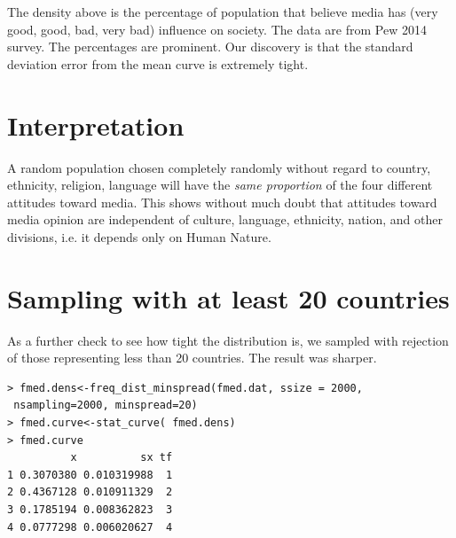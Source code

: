 \documentclass{amsart}
\begin{document}
The density above is the percentage of population that believe media has (very good, good, bad, very bad) influence on society.  The data are from Pew 2014 survey.  The percentages are prominent.  Our discovery is that the standard deviation error from the mean curve is extremely tight.  

\section{Interpretation}
A random population chosen completely randomly without regard to country, ethnicity, religion, language will have the {\em same proportion} of the four different attitudes toward media.  This shows without much doubt that attitudes toward media opinion are independent of culture, language, ethnicity, nation, and other divisions, i.e. it depends only on Human Nature.


\section{Sampling with at least 20 countries}

As a further check to see how tight the distribution is, we sampled with rejection of those representing less than 20 countries.  The result was sharper.

\begin{verbatim}
> fmed.dens<-freq_dist_minspread(fmed.dat, ssize = 2000,
 nsampling=2000, minspread=20)
> fmed.curve<-stat_curve( fmed.dens)
> fmed.curve
          x          sx tf
1 0.3070380 0.010319988  1
2 0.4367128 0.010911329  2
3 0.1785194 0.008362823  3
4 0.0777298 0.006020627  4
\end{verbatim}
\end{document}
